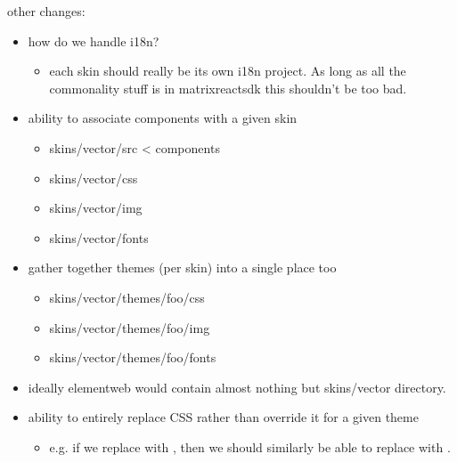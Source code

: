 \documentclass[letterpaper,10pt,openany,oneside,english]{sphinxmanual}
\begin{document}
\sphinxAtStartPar
other changes:
\begin{itemize}
\item {} 
\sphinxAtStartPar
how do we handle i18n?
\begin{itemize}
\item {} 
\sphinxAtStartPar
each skin should really be its own i18n project.  As long as all the commonality stuff is in matrix\sphinxhyphen{}react\sphinxhyphen{}sdk this shouldn’t be too bad.

\end{itemize}

\item {} 
\sphinxAtStartPar
ability to associate components with a given skin
\begin{itemize}
\item {} 
\sphinxAtStartPar
skins/vector/src \textless{}\textendash{} components

\item {} 
\sphinxAtStartPar
skins/vector/css

\item {} 
\sphinxAtStartPar
skins/vector/img

\item {} 
\sphinxAtStartPar
skins/vector/fonts

\end{itemize}

\item {} 
\sphinxAtStartPar
gather together themes (per skin) into a single place too
\begin{itemize}
\item {} 
\sphinxAtStartPar
skins/vector/themes/foo/css

\item {} 
\sphinxAtStartPar
skins/vector/themes/foo/img

\item {} 
\sphinxAtStartPar
skins/vector/themes/foo/fonts

\end{itemize}

\item {} 
\sphinxAtStartPar
ideally element\sphinxhyphen{}web would contain almost nothing but skins/vector directory.

\item {} 
\sphinxAtStartPar
ability to entirely replace CSS rather than override it for a given theme
\begin{itemize}
\item {} 
\sphinxAtStartPar
e.g. if we replace  with , then we should similarly be able to replace  with .

\end{itemize}

\end{itemize}
\end{document}
